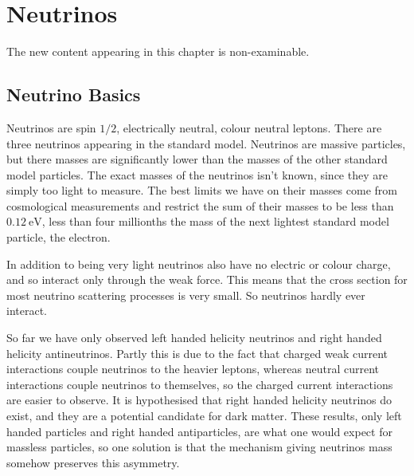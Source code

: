 \documentclass[fleqn]{NotesClass}
\begin{document}
    \chapter{Neutrinos}
    \begin{rmk}
        The new content appearing in this chapter is non-examinable.
    \end{rmk}
    
    \section{Neutrino Basics}
    Neutrinos are spin \(1/2\), electrically neutral, colour neutral leptons.
    There are three neutrinos appearing in the standard model.
    Neutrinos are massive particles, but there masses are significantly lower than the masses of the other standard model particles.
    The exact masses of the neutrinos isn't known, since they are simply too light to measure.
    The best limits we have on their masses come from cosmological measurements and restrict the sum of their masses to be less than \(\qty{0.12}{\electronvolt}\), less than four millionths the mass of the next lightest standard model particle, the electron.
    
    In addition to being very light neutrinos also have no electric or colour charge, and so interact only through the weak force.
    This means that the cross section for most neutrino scattering processes is very small.
    So neutrinos hardly ever interact.
    
    So far we have only observed left handed helicity neutrinos and right handed helicity antineutrinos.
    Partly this is due to the fact that charged weak current interactions couple neutrinos to the heavier leptons, whereas neutral current interactions couple neutrinos to themselves, so the charged current interactions are easier to observe.
    It is hypothesised that right handed helicity neutrinos do exist, and they are a potential candidate for dark matter.
    These results, only left handed particles and right handed antiparticles, are what one would expect for massless particles, so one solution is that the mechanism giving neutrinos mass somehow preserves this asymmetry.
    
\end{document}
